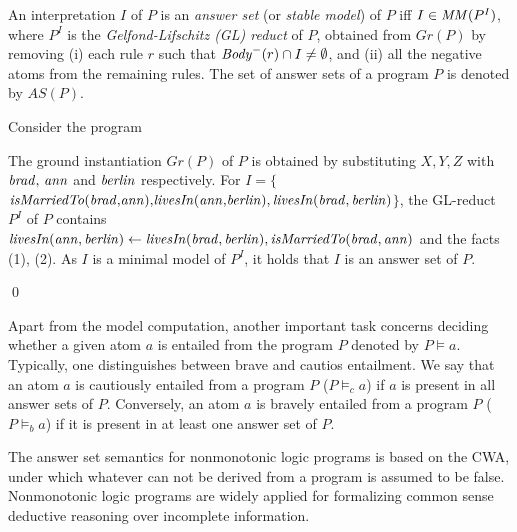 \begin{definition}
An interpretation $I$ of $P$ is an \emph{answer set} (or \emph{stable model}) of $P$ iff $I \in \mathit{MM}(P^I)$, where $P^I$ is the \emph{Gelfond-Lifschitz (GL) reduct} of $P$, obtained from $Gr(P)$ by removing (i) each rule $r$ such that $\mathit{Body}^-(r) \cap I\neq\emptyset$, and (ii) all the negative atoms from the remaining rules. The set of answer sets of a program $P$ is denoted by $AS(P)$.
\end{definition}



\begin{example}\label{ex:as}
Consider the program \\
{\small {}}
            
\normalsize
{\smallskip

\noindent            
The ground instantiation $Gr(P)$ of $P$ is obtained by substituting $X,Y,Z$ with $\mathit{brad, \,ann}$ and $\mathit{berlin}$ respectively. For $I{=}\{${\small$\mathit{isMarriedTo(brad{,}ann){,}livesIn(ann{,}berlin)},\\ \mathit{livesIn(brad,berlin)}$}$\}$, the GL-reduct $P^I$ of $P$ contains $\mathit{livesIn(ann,berlin)}\leftarrow \mathit{livesIn(brad,berlin),isMarriedTo(brad,ann)}$ and the facts (1), (2). As $I$ is a minimal model of $P^I$, it holds that $I$ is an answer set of $P$.}\qed
\end{example}
\normalsize

Apart from the model computation, another important task concerns deciding whether a given atom $a$ is entailed from the program $P$ denoted by $P \models a$. Typically, one distinguishes between brave and cautios entailment. We say that an atom $a$ is cautiously entailed from a program $P$ ($P \models_c a$) if $a$ is present in all answer sets of $P$. Conversely, an atom $a$ is bravely entailed from a program $P$ ($P \models_b a$) if it is present in at least one answer set of $P$.

The answer set semantics for nonmonotonic logic programs is based on the CWA, under which whatever can not be derived from a program is assumed to be false. Nonmonotonic logic programs are widely applied for formalizing common sense deductive reasoning over incomplete information.



